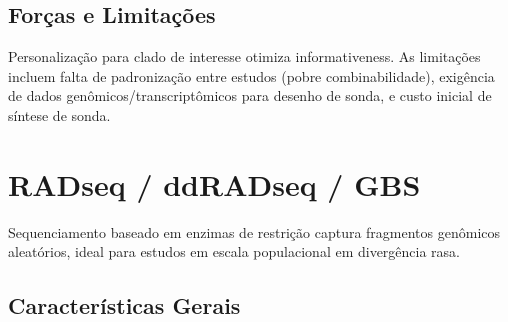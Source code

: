 \subsection{Forças e Limitações}

Personalização para clado de interesse otimiza informativeness. As limitações incluem falta de padronização entre estudos (pobre combinabilidade), exigência de dados genômicos/transcriptômicos para desenho de sonda, e custo inicial de síntese de sonda.

\textcite{bi2012, bragg2016, portik2016}

\section{RADseq / ddRADseq / GBS}

Sequenciamento baseado em enzimas de restrição captura fragmentos genômicos aleatórios, ideal para estudos em escala populacional em divergência rasa.

\subsection{Características Gerais}

